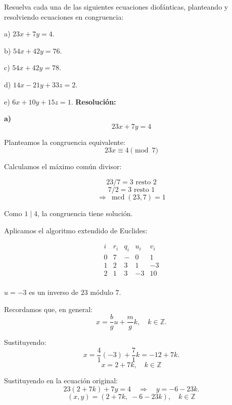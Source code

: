 \documentclass[a4paper,12pt]{article}
\begin{document}
\begin{ejercicio}[title=Ejercicio 33]
Resuelva cada una de las siguientes ecuaciones diofánticas, planteando y resolviendo ecuaciones en congruencia:

a) \; $23x + 7y = 4$.

b) \; $54x + 42y = 76$.

c) \; $54x + 42y = 78$.

d) \; $14x - 21y + 33z = 2$.

e) \; $6x + 10y + 15z = 1$.
\tcblower
\textbf{Resolución:}

\textbf{a)} \\[0.3em]
\[
23x + 7y = 4
\]

Planteamos la congruencia equivalente:
\[
23x \equiv 4 \pmod{7}
\]

Calculamos el máximo común divisor:

\[
23 / 7 = 3 \text{ resto } 2
\]
\[
7 / 2 = 3 \text{ resto } \boxed{1}
\]
\[
\Rightarrow \ \operatorname{mcd}(23,7) = \boxed{1}
\]

Como $1 \mid 4$, la congruencia tiene solución.

\vspace{0.5em}

Aplicamos el algoritmo extendido de Euclides:

\[
\begin{array}{c|c|c|c|c}
i & r_i & q_i & u_i & v_i \\ \hline
0 & 7 & - & 0 & 1 \\
1 & 2 & 3 & 1 & -3 \\
2 & \boxed{1} & 3 & -3 & 10 \\
\end{array}
\]

$u = -3$ es un inverso de $23$ módulo $7$.

\vspace{0.5em}

Recordamos que, en general:
\[
x = \frac{b}{g}u + \frac{m}{g}k, \quad k\in\mathbb{Z}.
\]

Sustituyendo:
\[
x = \frac{4}{1}(-3) + \frac{7}{1}k = -12 + 7k.
\]
\[
x = 2 + 7k, \quad k \in \mathbb{Z}
\]

\vspace{0.5em}

Sustituyendo en la ecuación original:
\[
23(2 + 7k) + 7y = 4 \quad \Rightarrow \quad y = -6 - 23k.
\]
\[
\boxed{(x, y) = (2 + 7k,\; -6 - 23k), \quad k \in \mathbb{Z}}
\]

\end{ejercicio}
\end{document}
